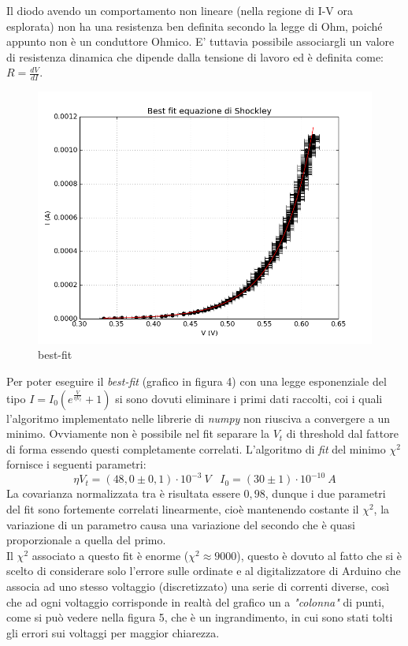 \documentclass[a4paper,10pt]{article}
\begin{document}
Il diodo avendo un comportamento non lineare (nella regione di I-V ora esplorata) non ha una resistenza ben definita secondo la legge di Ohm, poiché appunto non è un conduttore Ohmico. E' tuttavia possibile associargli un valore di resistenza dinamica che dipende dalla tensione di lavoro ed è definita come: $R = \frac{dV}{dI}$.

\begin{figure}[!htb]
\begin{center}
\includegraphics[width=\textwidth]{bestFitShockley.png}
\end{center}
\caption{best-fit}
\end{figure}

Per poter eseguire il \emph{best-fit} (grafico in figura 4) con una legge esponenziale del tipo $I = I_0(e^{\frac{V}{\eta V_t}}+1)$ si sono dovuti eliminare i primi dati raccolti, coi i quali l'algoritmo implementato nelle librerie di \emph{numpy} non riusciva a convergere a un minimo. Ovviamente non è possibile nel fit separare la $V_t$ di threshold dal fattore di forma essendo questi completamente correlati.
L'algoritmo di \emph{fit} del minimo $\chi^2$ fornisce i seguenti parametri:
\begin{equation}
\eta V_t = (48,0 \pm 0,1) \cdot 10^{-3}\:V\;\;\;I_0 =(30 \pm 1) \cdot 10^{-10}\:A
\end{equation}
La covarianza normalizzata tra è risultata essere $0,98$, dunque i due parametri del fit sono fortemente correlati linearmente, cioè mantenendo costante il $\chi^2$, la variazione di un parametro causa una variazione del secondo che è quasi proporzionale a quella del primo.
\\
Il $\chi^2$ associato a questo fit è enorme ($\chi^2 \approx 9000$), questo è dovuto al fatto che si è scelto di considerare solo l'errore sulle ordinate e al digitalizzatore di Arduino che associa ad uno stesso voltaggio (discretizzato) una serie di correnti diverse, così che ad ogni voltaggio corrisponde in realtà del grafico un a \emph{"colonna"} di punti, come si può vedere nella figura 5, che è un ingrandimento, in cui sono stati tolti gli errori sui voltaggi per maggior chiarezza.
\end{document}
